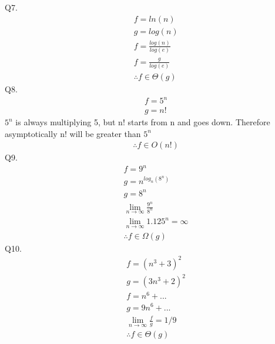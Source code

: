 \documentclass{article}
\begin{document}
	Q7.
	\begin{align*}
		&f = ln(n)\\
		&g = log(n)\\
		&f = \frac{log(n)}{log(e)}\\
		&f = \frac{g}{log(e)}\\
		&\therefore f\in\Theta(g)
	\end{align*}
	Q8.
	\begin{align*}
		&f = 5^n\\
		&g = n!
	\end{align*}
	$5^n$ is always multiplying 5, but n! starts from n and goes down. Therefore asymptotically n! will be greater than $5^n$
	\begin{align*}
		&\therefore f\in O(n!)
	\end{align*}
	\newpage
	Q9.
	\begin{align*}
		&f = 9^n\\
		&g = n^{log_n(8^n)}\\
		&g = 8^n\\
		&\lim_{n\to\infty}\frac{9^n}{8^n}\\
		&\lim_{n\to\infty}1.125^n=\infty\\
		&\therefore f\in\Omega(g)
	\end{align*}
	Q10.
	\begin{align*}
		&f = (n^3 + 3)^2\\
		&g = (3n^3 + 2)^2\\
		&f = n^6 + ...\\
		&g = 9n^6 + ...\\
		&\lim_{n\to\infty}\frac{f}{g} = 1/9\\
		&\therefore f\in\Theta(g)
	\end{align*}
\end{document}
